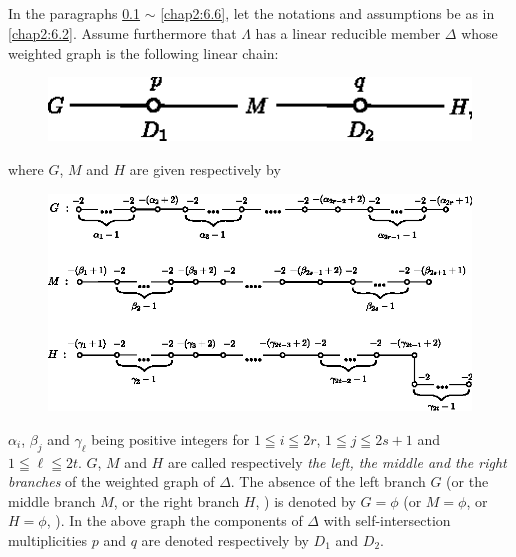 \subsection{}\label{chap2:6.4}
In the paragraphs \ref{chap2:6.4} $\sim$ \ref{chap2:6.6}, let the notations and
assumptions be as in \ref{chap2:6.2}. Assume furthermore that $\Lambda$ has
a linear reducible member $\Delta$ whose weighted graph is the
following linear chain:
\begin{figure}[H]
\centering
\includegraphics{figures/chap2-fig16.eps}
\end{figure}
\noindent
where $G$, $M$ and $H$ are given respectively by
\begin{figure}[H]
\centering
\includegraphics{figures/chap2-fig17.eps}
\end{figure}
\noindent
$\alpha_{i}$, $\beta_{j}$ and $\gamma_{\ell}$ being positive integers
for $1\leqq i\leqq 2r$, $1\leqq j\leqq 2s+1$ and $1\leqq \ell\leqq
2t$. $G$, $M$ and $H$ are called respectively {\em the left, the
  middle and the right branches} of the weighted graph of
$\Delta$. The absence of the left branch $G$ (or the middle branch
$M$, or the right branch $H$, \resp) is denoted by $G=\phi$ (or
$M=\phi$, or $H=\phi$, \resp). In the above graph the components of
$\Delta$ with self-intersection multiplicities $p$ and $q$ are denoted
respectively by $D_{1}$ and $D_{2}$. 

